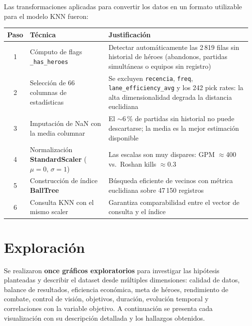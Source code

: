 \documentclass[12pt,a4paper]{article}
\begin{document}
Las transformaciones aplicadas para convertir los datos en un formato utilizable
para el modelo KNN fueron:

\begin{table}[h!]
\centering
\renewcommand{\arraystretch}{1.3}
\begin{tabular}{@{}c p{4.5cm} p{7cm}@{}}
  \toprule
  \textbf{Paso} & \textbf{T\'ecnica} & \textbf{Justificaci\'on} \\
  \midrule
  1 & C\'omputo de flags \texttt{\_has\_heroes}
    & Detectar autom\'aticamente las 2\,819 filas sin historial de h\'eroes
      (abandonos, partidas simult\'aneas o equipos sin registro) \\
  2 & Selecci\'on de 66 columnas de estad\'isticas
    & Se excluyen \texttt{recencia}, \texttt{freq}, \texttt{lane\_efficiency\_avg}
      y los 242 pick rates: la alta dimensionalidad degrada la distancia euclidiana \\
  3 & Imputaci\'on de NaN con la media columnar
    & El $\sim$6\,\% de partidas sin historial no puede descartarse;
      la media es la mejor estimaci\'on disponible \\
  4 & Normalizaci\'on \textbf{StandardScaler} ($\mu=0,\,\sigma=1$)
    & Las escalas son muy dispares: GPM $\approx$400 vs.\ Roshan kills $\approx$0.3 \\
  5 & Construcci\'on de \'indice \textbf{BallTree}
    & B\'usqueda eficiente de vecinos con m\'etrica euclidiana sobre 47\,150 registros \\
  6 & Consulta KNN con el mismo scaler
    & Garantiza comparabilidad entre el vector de consulta y el \'indice \\
  \bottomrule
\end{tabular}
\end{table}

\section{Exploraci\'on}

Se realizaron \textbf{once gr\'aficos exploratorios} para investigar las hip\'otesis
planteadas y describir el dataset desde m\'ultiples dimensiones: calidad de datos,
balance de resultados, eficiencia econ\'omica, meta de h\'eroes, rendimiento de
combate, control de visi\'on, objetivos, duraci\'on, evoluci\'on temporal y
correlaciones con la variable objetivo. A continuaci\'on se presenta cada
visualizaci\'on con su descripci\'on detallada y los hallazgos obtenidos.
\end{document}
